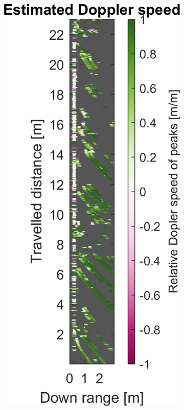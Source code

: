 \begin{figure}[htbp]
\begin{subfigure}[t]{0.475\linewidth}
    \end{subfigure}%
    \hfill%
    \begin{subfigure}[t]{0.475\linewidth}
        \centering
        \includegraphics[width=\linewidth,max height=.475\textheight]{gfx/results/sauna_doppler.png}

\end{subfigure}
\end{figure}
